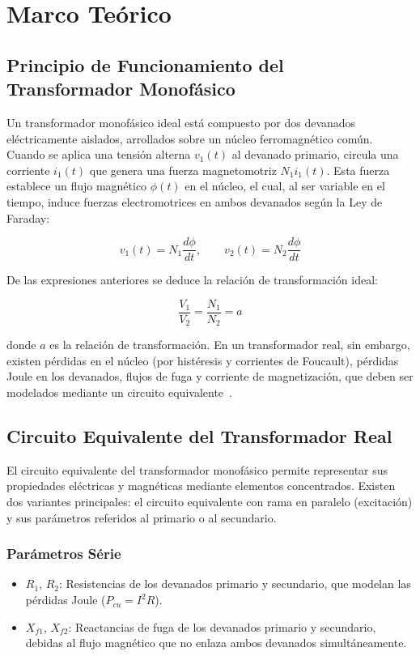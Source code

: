 \section{Marco Teórico}

\subsection{Principio de Funcionamiento del Transformador Monofásico}

Un transformador monofásico ideal está compuesto por dos devanados eléctricamente aislados, arrollados sobre un núcleo ferromagnético común. Cuando se aplica una tensión alterna $v_1(t)$ al devanado primario, circula una corriente $i_1(t)$ que genera una fuerza magnetomotriz $N_1 i_1(t)$. Esta fuerza establece un flujo magnético $\phi(t)$ en el núcleo, el cual, al ser variable en el tiempo, induce fuerzas electromotrices en ambos devanados según la Ley de Faraday:

\begin{equation}
    v_1(t) = N_1 \frac{d\phi}{dt}, \qquad v_2(t) = N_2 \frac{d\phi}{dt}
\end{equation}

De las expresiones anteriores se deduce la relación de transformación ideal:

\begin{equation}
    \frac{V_1}{V_2} = \frac{N_1}{N_2} = a
\end{equation}

donde $a$ es la relación de transformación. En un transformador real, sin embargo, existen pérdidas en el núcleo (por histéresis y corrientes de Foucault), pérdidas Joule en los devanados, flujos de fuga y corriente de magnetización, que deben ser modelados mediante un circuito equivalente~\cite{chapman,ras}.

\subsection{Circuito Equivalente del Transformador Real}

El circuito equivalente del transformador monofásico permite representar sus propiedades eléctricas y magnéticas mediante elementos concentrados. Existen dos variantes principales: el circuito equivalente con rama en paralelo (excitación) y sus parámetros referidos al primario o al secundario.

\subsubsection{Parámetros Série}
\begin{itemize}
    \item $R_1$, $R_2$: Resistencias de los devanados primario y secundario, que modelan las pérdidas Joule ($P_{cu} = I^2R$).
    \item $X_{f1}$, $X_{f2}$: Reactancias de fuga de los devanados primario y secundario, debidas al flujo magnético que no enlaza ambos devanados simultáneamente.
\end{itemize}

